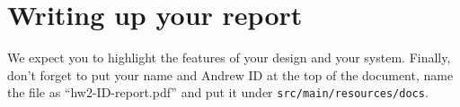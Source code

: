 
\section{Writing up your report}

We expect you to highlight the features of your design and your system. Finally,
don't forget to put your name and Andrew ID at the top of the document, name the
file as ``hw2-ID-report.pdf'' and put it under \texttt{src/main/resources/docs}.
